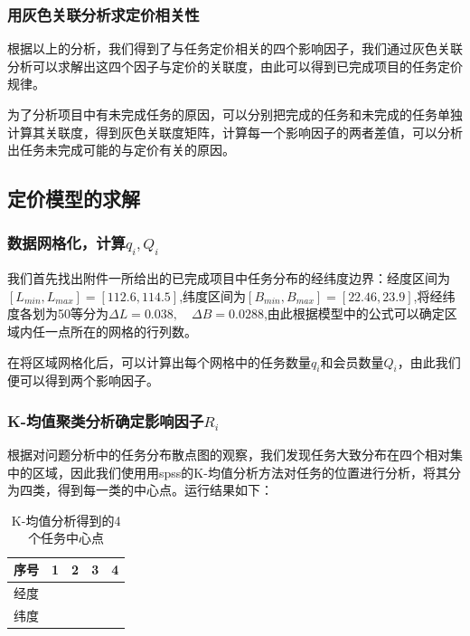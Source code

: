 \documentclass[withoutpreface,bwprint]{cumcmthesis} %
\begin{document}
\subsubsection{用灰色关联分析求定价相关性}

根据以上的分析，我们得到了与任务定价相关的四个影响因子，我们通过灰色关联分析可以求解出这四个因子与定价的关联度，由此可以得到已完成项目的任务定价规律。

为了分析项目中有未完成任务的原因，可以分别把完成的任务和未完成的任务单独计算其关联度，得到灰色关联度矩阵，计算每一个影响因子的两者差值，可以分析出任务未完成可能的与定价有关的原因。

\subsection{定价模型的求解}
\subsubsection{数据网格化，计算$q_i,Q_i$}

我们首先找出附件一所给出的已完成项目中任务分布的经纬度边界：经度区间为$[L_{min},L_{max}]=[112.6,114.5]$,纬度区间为$[B_{min},B_{max}]=[22.46,23.9]$,将经纬度各划为50等分为$\Delta L=0.038,\quad \Delta B=0.0288$,由此根据模型中的公式可以确定区域内任一点所在的网格的行列数。

在将区域网格化后，可以计算出每个网格中的任务数量$q_i$和会员数量$Q_i$，由此我们便可以得到两个影响因子。

\subsubsection{K-均值聚类分析确定影响因子$R_i$}

根据对问题分析中的任务分布散点图的观察，我们发现任务大致分布在四个相对集中的区域，因此我们使用用spss的K-均值分析方法对任务的位置进行分析，将其分为四类，得到每一类的中心点。运行结果如下：
\begin{table}[H]
    \centering
    \caption{K-均值分析得到的4个任务中心点}
    \label{tab:表}
    \begin{tabular}{|c|c|c|c|c|}
    \hline
    序号 & 1 & 2 & 3 & 4 \\ \hline
    经度 &   &   &   &   \\ \hline
    纬度 &   &   &   &   \\ \hline
    \end{tabular}
    \end{table}
\end{document}
